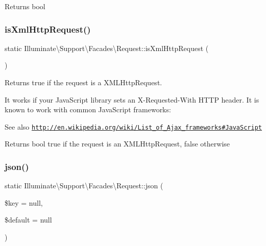 \begin{DoxyReturn}{Returns}
bool 
\end{DoxyReturn}
\mbox{\label{class_illuminate_1_1_support_1_1_facades_1_1_request_aacae65b6bad777a385ac6ef34651e18a}} 
\subsubsection{\texorpdfstring{is\+Xml\+Http\+Request()}{isXmlHttpRequest()}}
{\footnotesize\ttfamily static Illuminate\textbackslash{}\+Support\textbackslash{}\+Facades\textbackslash{}\+Request\+::is\+Xml\+Http\+Request (\begin{DoxyParamCaption}{ }\end{DoxyParamCaption})\hspace{0.3cm}{\ttfamily [static]}}

Returns true if the request is a X\+M\+L\+Http\+Request.

It works if your Java\+Script library sets an X-\/\+Requested-\/\+With H\+T\+TP header. It is known to work with common Java\+Script frameworks\+:

\begin{DoxySeeAlso}{See also}
\href{http://en.wikipedia.org/wiki/List_of_Ajax_frameworks#JavaScript}{\tt http\+://en.\+wikipedia.\+org/wiki/\+List\+\_\+of\+\_\+\+Ajax\+\_\+frameworks\#\+Java\+Script} 
\end{DoxySeeAlso}
\begin{DoxyReturn}{Returns}
bool true if the request is an X\+M\+L\+Http\+Request, false otherwise 
\end{DoxyReturn}
\mbox{\label{class_illuminate_1_1_support_1_1_facades_1_1_request_ad03fe88fc6916a4a2a1a9f3da85bdc77}} 
\subsubsection{\texorpdfstring{json()}{json()}}
{\footnotesize\ttfamily static Illuminate\textbackslash{}\+Support\textbackslash{}\+Facades\textbackslash{}\+Request\+::json (\begin{DoxyParamCaption}\item[{}]{\$key = {\ttfamily null},  }\item[{}]{\$default = {\ttfamily null} }\end{DoxyParamCaption})\hspace{0.3cm}{\ttfamily [static]}}

